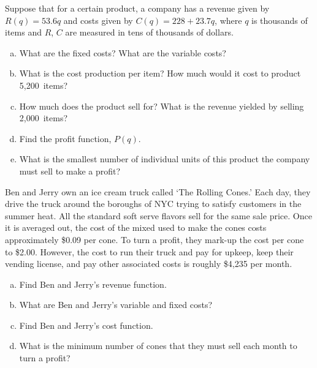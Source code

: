 \documentclass[11pt,letterpaper]{article}
\begin{document}

 Suppose that for a certain product, a company has a revenue given by $R(q)= 53.6q$ and costs given by $C(q)= 228 + 23.7q$, where $q$ is thousands of items and $R$, $C$ are measured in tens of thousands of dollars.
	\begin{enumerate}[(a)]
	\item What are the fixed costs? What are the variable costs?
	\item What is the cost production per item? How much would it cost to product 5,200~items?
	\item How much does the product sell for? What is the revenue yielded by selling 2,000~items?
	\item Find the profit function, $P(q)$.
	\item What is the smallest number of individual units of this product the company must sell to make a profit?
	\end{enumerate}



\newpage



 Ben and Jerry own an ice cream truck called `The Rolling Cones.' Each day, they drive the truck around the boroughs of NYC trying to satisfy customers in the summer heat. All the standard soft serve flavors sell for the same sale price. Once it is averaged out, the cost of the mixed used to make the cones costs approximately \$0.09 per cone. To turn a profit, they mark-up the cost per cone to \$2.00. However, the cost to run their truck and pay for upkeep, keep their vending license, and pay other associated costs is roughly \$4,235 per month. 
	\begin{enumerate}[(a)]
	\item Find Ben and Jerry's revenue function.
	\item What are Ben and Jerry's variable and fixed costs?
	\item Find Ben and Jerry's cost function. 
	\item What is the minimum number of cones that they must sell each month to turn a profit?
	\end{enumerate}



\newpage
\end{document}
